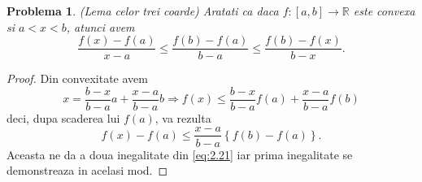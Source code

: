 \documentclass[a4paper,12pt,oneside]{report}
\newtheorem{problem}{Problema}
\begin{document}
\begin{problem} (Lema celor trei coarde)
Aratati ca daca \(f : \left [ a,b \right ]  \to \mathbb{R}\) este convexa si \(a <  x < b\), atunci avem
\begin{displaymath}
    \frac{f\left ( x \right ) - f\left ( a \right )}{x - a} \leq \frac{f\left ( b \right ) - f\left ( a \right )}{b - a} \leq  \frac{f\left ( b \right ) - f\left ( x \right )}{b - x}.   \label{eq:2.21}\tag{2.21}
\end{displaymath}
\end{problem}
\begin{proof}
Din convexitate avem
\begin{displaymath}
    x = \frac{b - x}{b - a}a + \frac{x - a}{b - a }b \Rightarrow f\left ( x \right ) \leq \frac{b - x}{b - a}f\left ( a \right ) + \frac{x - a}{b - a }f\left ( b \right )
\end{displaymath}
 deci, dupa scaderea lui \(f\left ( a \right )\), va rezulta
 \begin{displaymath}
     f\left ( x \right ) - f\left ( a \right )\leq \frac{x - a}{b - a }\left \{ f\left ( b \right ) - f\left ( a \right ) \right \}. \label{eq:2.22} \tag{2.22}
 \end{displaymath}
Aceasta ne da a doua inegalitate din \ref{eq:2.21} iar prima inegalitate se demonstreaza in acelasi mod.
\end{proof}









\setlength{\baselineskip}{\normalbaselineskip}
\setlength{\parskip}{0pt}

\end{document}
